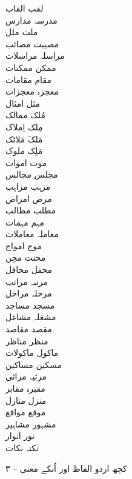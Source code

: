 \documentclass[a4paper]{article}
\begin{document}
\begin{multicols}{3}
\begin{tabbing}
لقب \> القاب\\
مدرسہ \> مدارس\\
ملت \> ملل\\
مصیبت \> مصائب\\
مراسلہ \> مراسلات\\
ممکن \> ممکنات\\
مقام \> مقامات\\
معجزہ \> معجزات\\
مثل \> امثال\\
مُلک \> ممالک\\
مِلک \> اِملاک\\
مَلکَ \> مَلائک\\
مَلِک \> ملوک\\
موت \> اموات\\
مجلس \> مجالس\\
مزہب \> مزاہب\\
مرض \> امراض\\
مطلب \> مطالب\\
مہم \> مہمات\\
معاملہ \> معاملات\\
موج \> امواج\\
محنت \> محِن\\
محفل \> محافل\\
مرتبہ \> مراتب\\
مرحلہ \> مراحل\\
مسجد \> مساجد\\
مشغلہ \> مشاغل\\
مقصد \> مقاصد\\
منظر \> مناظر\\
ماکول \> ماکولات\\
مسکین \> مساکین\\
مرثیہ \> مراثی\\
مقبرہ \> مقابر\\
منزل \> منازل\\
موقع \> مواقع\\
مشہور \> مشاہیر\\
نور \> انوار\\
نکتہ \> نکات\\
\end{tabbing}
\end{multicols}
\clearpage
\begin{center}
{\fontsize{36pt}{18pt}\titlefont ۳ – کچھ اردو الفاظ اور اُنکے معنی}
\end{center}
\end{document}
